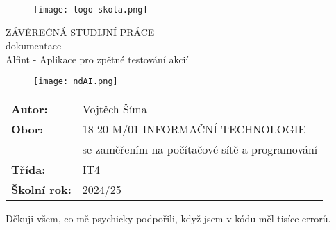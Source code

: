 \documentclass[12pt, a4paper]{report}
\title{\nazevPrace}
\author{\jmenoAutora}
\date{\datumOdevzdani}
\newcommand\obor{INFORMAČNÍ TECHNOLOGIE}
\newcommand\kodOboru{18-20-M/01}
\newcommand\zamereni{se zaměřením na počítačové sítě a programování}
\newcommand\trida{IT4}
\newcommand\jmenoAutora{Vojtěch Šíma}
\newcommand\skolniRok{2024/25}
\newcommand\nazevPrace{Alfint - Aplikace pro zpětné testování akcií}
\begin{document}
	
	\pagestyle{empty}
	
	\cleardoublepage
	
	{\selectfont
		\begin{figure}[h]
			\centering
			\texttt{[image: logo-skola.png]}
		\end{figure}
		
		
		{\bfseries %
			\begin{center}
				\vspace{0.025 \textheight}
				\LARGE{ZÁVĚREČNÁ STUDIJNÍ PRÁCE}\\
				\large{dokumentace}\\
				\vspace{0.075 \textheight}
				\LARGE {\nazevPrace}\\
			\end{center}  
		}%

        \begin{figure}[h]
			\centering
			\texttt{[image: ndAI.png]}
			\label{fig:main-screen}
		\end{figure}

    \vspace{0.02 \textheight}
		\begin{table}[h!]
			\begin{tabular}{ll}
				\textbf{Autor:} & \jmenoAutora\\ 
				\textbf{Obor:} & \kodOboru { } \obor\\
				\textbf{} & \zamereni\\
				\textbf{Třída:} & \trida\\
				\textbf{Školní rok:} & \skolniRok\\
			\end{tabular}
			
		\end{table}		
	}
	
	\clearpage

    

	
	\noindent Děkuji všem, co mě psychicky podpořili, když jsem v kódu měl tisíce errorů.
	
\end{document}
